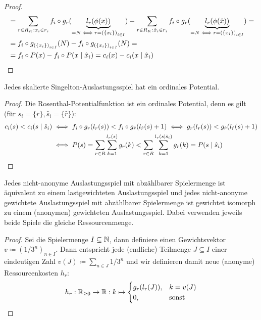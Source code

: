 \begin{proof}
\begin{align*}
	&=\sum_{r \in R_K: x_{\hat{\imath}} \in r_{\hat{\imath}}} f_i \circ g_r(\underbrace{l_r(\phi(x))}_{= N \iff r = \left(\{x_i\}\right)_{i \in I}}) -
		\sum_{r \in R_K: \hat{x}_{\hat{\imath}} \in r_{\hat{\imath}}} f_i \circ g_r(\underbrace{l_r(\phi(\hat{x}))}_{= N \iff r = \left(\{x_i\}\right)_{i \in I}}) = \\
	&=f_i \circ g_{\left(\{x_i\}\right)_{i \in I}}(N) - f_i \circ g_{\left(\{x_i\}\right)_{i \in I}}(N) = \\
	&=f_i \circ P(x) - f_i \circ P(x \mid \hat{x}_i) = c_i(x) - c_i(x \mid \hat{x}_i)	\qedhere							
	\end{align*}
\end{proof}

\begin{satz}
	Jedes skalierte Singelton-Auslastungsspiel hat ein ordinales Potential.
\end{satz}

\begin{proof}
	Die Rosenthal-Potentialfunktion ist ein ordinales Potential, denn es gilt (für $s_i = \{r\}, \hat{s}_i = \{\hat{r}\}$):
	\begin{align*}
		c_i(s) < c_i(s \mid \hat{s}_i) &\iff f_i\circ g_r(l_r(s)) < f_i\circ g_{\hat{r}}(l_{\hat{r}}(s)+1) \iff g_r(l_r(s)) < g_{\hat{r}}(l_{\hat{r}}(s)+1) \\
										&\iff P(s) = \sum_{r \in R}\sum_{k=1}^{l_r(s)} g_r(k) < \sum_{r \in R}\sum_{k=1}^{l_r(s\mid \hat{s}_i)} g_r(k) = P(s\mid \hat{s}_i) \qedhere
	\end{align*}
\end{proof}

\begin{satz}
	Jedes nicht-anonyme Auslastungsspiel mit abzählbarer Spielermenge ist äquivalent zu einem lastgewichteten Auslastungsspiel und jedes nicht-anonyme gewichtete Auslastungsspiel mit abzählbarer Spielermenge ist gewichtet isomorph zu einem (anonymen) gewichteten Auslastungsspiel. Dabei verwenden jeweils beide Spiele die gleiche Ressourcenmenge.
\end{satz}

\begin{proof}
	Sei die Spielermenge $I \subseteq \mathbb{N}$, dann definiere einen Gewichtsvektor $v \coloneqq (1/3^n)_{n \in I}$. Dann entspricht jede (endliche) Teilmenge $J \subseteq I$ einer eindeutigen Zahl $v(J) \coloneqq \sum_{n \in J} 1/3^n$ und wir definieren damit neue (anonyme) Ressourcenkosten $h_r$:
	\[h_r: \mathbb{R}_{\geq 0} \to \mathbb{R}: k \mapsto \begin{cases}
	g_r(l_r(J)), 	&k = v(J) \\
	0,				&\text{sonst}
	\end{cases} \]
\end{proof}

